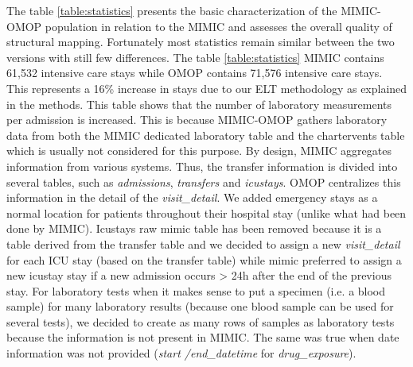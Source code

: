 The table \ref{table:statistics} presents the basic characterization of the 
MIMIC-OMOP population in relation to the MIMIC and assesses the overall quality of 
structural mapping.
Fortunately most statistics remain similar between the two versions with still
few differences. The table \ref{table:statistics} MIMIC contains 61,532
intensive care stays while OMOP contains 71,576 intensive care stays. This
represents a 16\% increase in stays due to our ELT methodology as explained in
the methods. This table shows that the number of laboratory measurements per
admission is increased. This is because MIMIC-OMOP gathers laboratory data from
both the MIMIC dedicated laboratory table and the chartervents table which is
usually not considered for this purpose.
% 
By design, MIMIC aggregates information from various systems\cite{mimic-omop-github}.
Thus, the transfer information is divided into several tables, such as
\textit{admissions}, \textit{transfers} and \textit{icustays}. OMOP centralizes
this information in the detail of the \textit{visit\_detail}. 
We added emergency stays as a normal location for patients throughout their 
hospital stay (unlike what had been done by MIMIC). Icustays raw mimic table has 
been removed because it is a table derived from the transfer table \cite{icustays-doc} 
and we decided to assign a new \textit{visit\_detail} for each ICU stay (based on 
the transfer table) while mimic preferred to assign a new icustay stay if a new 
admission occurs > 24h after the end of the previous stay.
For laboratory tests when it makes sense to put a specimen (i.e. a blood sample)
for many laboratory results (because one blood sample can be used for several
tests), we decided to create as many rows of samples as laboratory tests
because the information is not present in MIMIC. The same was true when date
information was not provided (\textit{start /end\_datetime} for
\textit{drug\_exposure}).

